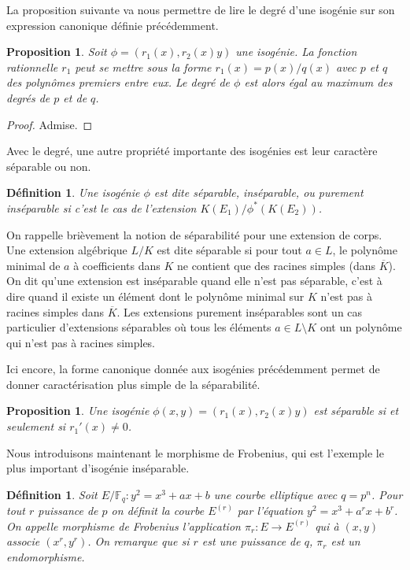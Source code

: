 \documentclass{article}
\theoremstyle{plain}%
\newtheorem{prop}[thm]{Proposition}
\newtheorem{deff}[thm]{Définition}
\theoremstyle{definition}%
\newcommand{\F}{\mathbb{F}}
\begin{document}
La proposition suivante va nous permettre de lire le degré d'une isogénie sur son expression canonique définie précédemment.

\begin{prop}
  \label{caracdeg}
  Soit $\phi = (r_1(x), r_2(x)y)$ une isogénie. La fonction rationnelle $r_1$ peut se mettre sous la forme $r_1(x) = p(x) / q(x)$ avec $p$ et $q$ des polynômes premiers entre eux. Le degré de $\phi$ est alors égal au maximum des degrés de $p$ et de $q$. 
\end{prop}

\begin{proof}
  Admise. 
\end{proof}

Avec le degré, une autre propriété importante des isogénies est leur caractère séparable ou non.

\begin{deff}
  Une isogénie $\phi$ est dite séparable, inséparable, ou purement inséparable si c'est le cas de l'extension $K(E_1) / \phi^*(K(E_2))$.
\end{deff}

On rappelle brièvement la notion de séparabilité pour une extension de corps. Une extension algébrique $L/K$ est dite séparable si pour tout $a\in L$, le polynôme minimal de $a$ à coefficients dans $K$ ne contient que des racines simples (dans $\overline{K}$). On dit qu'une extension est inséparable quand elle n'est pas séparable, c'est à dire quand il existe un élément dont le polynôme minimal sur $K$ n'est pas à racines simples dans $\overline{K}$. Les extensions purement inséparables sont un cas particulier d'extensions séparables où tous les éléments $a\in L \setminus K$ ont un polynôme qui n'est pas à racines simples.

Ici encore, la forme canonique donnée aux isogénies précédemment permet de donner caractérisation plus simple de la séparabilité.

\begin{prop}
  \label{caracsep}
  Une isogénie $\phi(x, y) = (r_1(x), r_2(x)y)$ est séparable si et seulement si $r_1'(x) \neq 0$.
\end{prop}

Nous introduisons maintenant le morphisme de Frobenius, qui est l'exemple le plus important d'isogénie inséparable.

\begin{deff}
  Soit $E/\F_q : y^2 = x^3 + ax + b$ une courbe elliptique avec $q = p^n$. Pour tout $r$ puissance de $p$ on définit la courbe $E^{(r)}$ par l'équation $y^2 = x^3 + a^r x + b^r$. On appelle morphisme de Frobenius l'application $\pi_r : E \to E^{(r)}$ qui à $(x, y)$ associe $(x^r, y^r)$. On remarque que si $r$ est une puissance de $q$, $\pi_r$ est un endomorphisme.
\end{deff}
\end{document}
